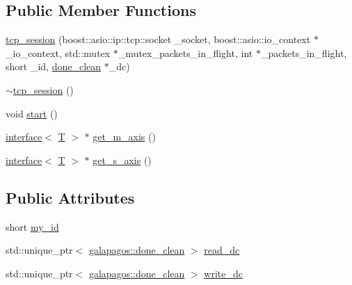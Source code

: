 \subsection*{Public Member Functions}
\begin{DoxyCompactItemize}
\item 
\hyperlink{classgalapagos_1_1net_1_1tcp__session_ab893344dbd9d66ca8d21f40a76ec3ce0}{tcp\+\_\+session} (boost\+::asio\+::ip\+::tcp\+::socket \+\_\+socket, boost\+::asio\+::io\+\_\+context $\ast$\+\_\+io\+\_\+context, std\+::mutex $\ast$\+\_\+mutex\+\_\+packets\+\_\+in\+\_\+flight, int $\ast$\+\_\+packets\+\_\+in\+\_\+flight, short \+\_\+id, \hyperlink{classgalapagos_1_1done__clean}{done\+\_\+clean} $\ast$\+\_\+dc)
\item 
\hyperlink{classgalapagos_1_1net_1_1tcp__session_aa78485373ac174037d97bcb07e89e7d1}{$\sim$tcp\+\_\+session} ()
\item 
void \hyperlink{classgalapagos_1_1net_1_1tcp__session_a05dba3e74c5eb60feae0d480ba680595}{start} ()
\item 
\hyperlink{classgalapagos_1_1interface}{interface}$<$ \hyperlink{test_8cpp_a0658ceffa730c765d449bb3d21871b5f}{T} $>$ $\ast$ \hyperlink{classgalapagos_1_1net_1_1tcp__session_ab92743d088c4d3da7da60ce9dd083d53}{get\+\_\+m\+\_\+axis} ()
\item 
\hyperlink{classgalapagos_1_1interface}{interface}$<$ \hyperlink{test_8cpp_a0658ceffa730c765d449bb3d21871b5f}{T} $>$ $\ast$ \hyperlink{classgalapagos_1_1net_1_1tcp__session_abd5d37151d61838bd1a869d65cb4f7f0}{get\+\_\+s\+\_\+axis} ()
\end{DoxyCompactItemize}
\subsection*{Public Attributes}
\begin{DoxyCompactItemize}
\item 
short \hyperlink{classgalapagos_1_1net_1_1tcp__session_aefce375d01a745fe43f8a95f9287e42c}{my\+\_\+id}
\item 
std\+::unique\+\_\+ptr$<$ \hyperlink{classgalapagos_1_1done__clean}{galapagos\+::done\+\_\+clean} $>$ \hyperlink{classgalapagos_1_1net_1_1tcp__session_a532c328580ac4fcd0fc6fd5eea889b9d}{read\+\_\+dc}
\item 
std\+::unique\+\_\+ptr$<$ \hyperlink{classgalapagos_1_1done__clean}{galapagos\+::done\+\_\+clean} $>$ \hyperlink{classgalapagos_1_1net_1_1tcp__session_ac368eff45244f67202dab352444f0369}{write\+\_\+dc}
\end{DoxyCompactItemize}


